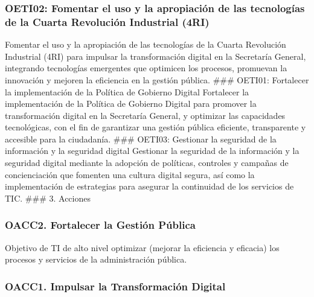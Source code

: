 \documentclass[
	a4paper, %
	12pt, %
]{include/CSSullivanBusinessReport}
\begin{document}
\subsubsection{OETI02: Fomentar el uso y la apropiación de las
tecnologías de la Cuarta Revolución Industrial
(4RI)}\label{sec:oeti02-fomentar-el-uso-y-la-apropiaciuxf3n-de-las-tecnologuxedas-de-la-cuarta-revoluciuxf3n-industrial-4ri}

Fomentar el uso y la apropiación de las tecnologías de la Cuarta
Revolución Industrial (4RI) para impulsar la transformación digital en
la Secretaría General, integrando tecnologías emergentes que optimicen
los procesos, promuevan la innovación y mejoren la eficiencia en la
gestión pública. \#\#\# OETI01: Fortalecer la implementación de la
Política de Gobierno Digital Fortalecer la implementación de la Política
de Gobierno Digital para promover la transformación digital en la
Secretaría General, y optimizar las capacidades tecnológicas, con el fin
de garantizar una gestión pública eficiente, transparente y accesible
para la ciudadanía. \#\#\# OETI03: Gestionar la seguridad de la
información y la seguridad digital Gestionar la seguridad de la
información y la seguridad digital mediante la adopción de políticas,
controles y campañas de concienciación que fomenten una cultura digital
segura, así como la implementación de estrategias para asegurar la
continuidad de los servicios de TIC. \#\#\# 3. Acciones

\subsubsection{OACC2. Fortalecer la Gestión
Pública}\label{sec:oacc2.-fortalecer-la-gestiuxf3n-puxfablica}

Objetivo de TI de alto nivel optimizar (mejorar la eficiencia y
eficacia) los procesos y servicios de la administración pública.

\subsubsection{OACC1. Impulsar la Transformación
Digital}\label{sec:oacc1.-impulsar-la-transformaciuxf3n-digital}
\end{document}
